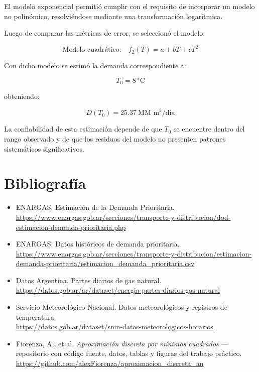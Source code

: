 \documentclass[12pt,a4paper]{article}
\newcommand{\unidadDemanda}{\text{MM m}^3/\text{día}}
\newcommand{\unidadTemp}{^\circ\text{C}}
\begin{document}
El modelo exponencial permitió cumplir con el requisito de incorporar un modelo no polinómico, resolviéndose mediante una transformación logarítmica.

Luego de comparar las métricas de error, se seleccionó el modelo:

\[
    \boxed{\text{Modelo cuadrático:}\quad f_2(T)=a+bT+cT^2}
\]

Con dicho modelo se estimó la demanda correspondiente a:

\[
    T_0 = \boxed{8} \ \unidadTemp
\]

obteniendo:

\[
    D(T_0)=\boxed{\num{25.37}} \ \unidadDemanda
\]

La confiabilidad de esta estimación depende de que \(T_0\) se encuentre dentro del rango observado y de que los residuos del modelo no presenten patrones sistemáticos significativos.

\section{Bibliografía}

\begin{itemize}
    \item ENARGAS. Estimación de la Demanda Prioritaria.\\
    \url{https://www.enargas.gob.ar/secciones/transporte-y-distribucion/dod-estimacion-demanda-prioritaria.php}

    \item ENARGAS. Datos históricos de demanda prioritaria.\\
    \url{https://www.enargas.gob.ar/secciones/transporte-y-distribucion/estimacion-demanda-prioritaria/estimacion_demanda_prioritaria.csv}

    \item Datos Argentina. Partes diarios de gas natural.\\
    \url{https://datos.gob.ar/ar/dataset/energia-partes-diarios-gas-natural}

    \item Servicio Meteorológico Nacional. Datos meteorológicos y registros de temperatura.\\
    \url{https://datos.gob.ar/dataset/smn-datos-meteorologicos-horarios}

    \item Fiorenza, A.; et al. \textit{Aproximación discreta por mínimos cuadrados} --- repositorio con código fuente, datos, tablas y figuras del trabajo práctico.\\
    \url{https://github.com/alexFiorenza/aproximacion_discreta_an}
\end{itemize}
\end{document}
